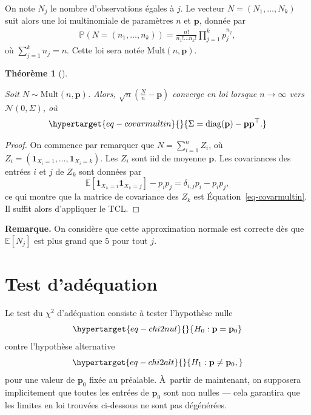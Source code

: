 \documentclass[
  10,
  letterpaper,
  DIV=11,
  numbers=noendperiod]{scrreport}
\theoremstyle{plain}
\newtheorem{theorem}{Théorème}[chapter]
\theoremstyle{definition}
\theoremstyle{plain}
\theoremstyle{definition}
\theoremstyle{definition}
\theoremstyle{plain}
\theoremstyle{remark}
\begin{document}
On note \(N_j\) le nombre d'observations égales à \(j\). Le vecteur
\(N=(N_1, \dotsc, N_k)\) suit alors une loi multinomiale de paramètres
\(n\) et \(\mathbf{p}\), donnée par \begin{align*}
\mathbb{P}(N = (n_1, \dotsc, n_k)) = \frac{n!}{n_1! \dotsc n_k!} \prod_{j=1}^k {p}_j^{n_j},
\end{align*} où \(\sum_{j=1}^k n_j = n\). Cette loi sera notée
\(\mathrm{Mult}(n, \mathbf{p})\).

\begin{theorem}[]\protect\hypertarget{thm-cvloimult}{}\label{thm-cvloimult}

Soit \(N \sim \mathrm{Mult}(n,\mathbf{p})\). Alors,
\(\sqrt{n}(\frac{N}{n}- \mathbf{p})\) converge en loi lorsque
\(n\to\infty\) vers \(\mathcal{N}(0, \Sigma)\), où
\begin{equation}\protect\hypertarget{eq-covarmultin}{}{ \Sigma = \mathrm{diag}(\mathbf{p}) - \mathbf{p}\mathbf{p}^\top.}\label{eq-covarmultin}\end{equation}

\end{theorem}

\begin{proof}

On commence par remarquer que \(N = \sum_{i=1}^n Z_i\), où
\(Z_i=(\mathbf{1}_{X_i=1}, \dotsc, \mathbf{1}_{X_i=k})\). Les \(Z_i\)
sont iid de moyenne \(\mathbf{p}\). Les covariances des entrées \(i\) et
\(j\) de \(Z_k\) sont données par
\[\mathbb{E}[\mathbf{1}_{X_k=i}\mathbf{1}_{X_k=j}] - p_i p_j = \delta_{i,j}p_i - p_i p_j,\]
ce qui montre que la matrice de covariance des \(Z_k\) est
Équation~\ref{eq-covarmultin}. Il suffit alors d'appliquer le TCL.

\end{proof}

\textbf{Remarque.} On considère que cette approximation normale est
correcte dès que \(\mathbb{E}[N_j]\) est plus grand que \(5\) pour tout
\(j\).

\hypertarget{test-daduxe9quation}{%
\section{Test d'adéquation}\label{test-daduxe9quation}}

Le test du \(\chi^2\) d'adéquation consiste à tester l'hypothèse nulle
\begin{equation}\protect\hypertarget{eq-chi2nul}{}{H_0: \mathbf{p}= \mathbf{p}_0}\label{eq-chi2nul}\end{equation}
contre l'hypothèse alternative
\begin{equation}\protect\hypertarget{eq-chi2alt}{}{H_1:\mathbf{p} \neq \mathbf{p}_0,}\label{eq-chi2alt}\end{equation}
pour une valeur de \(\mathbf{p}_0\) fixée au préalable. À~partir de
maintenant, on supposera implicitement que toutes les entrées de
\(\mathbf{p}_0\) sont non nulles --- cela garantira que les limites en
loi trouvées ci-dessous ne sont pas dégénérées.
\end{document}
